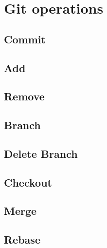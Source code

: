 \section{Git operations}

\subsection{Commit}

\subsection{Add}

\subsection{Remove}

\subsection{Branch}

\subsection{Delete Branch}

\subsection{Checkout}

\subsection{Merge}

\subsection{Rebase}
